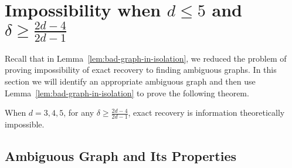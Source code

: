 \section{Impossibility when $d\le 5$ and $\delta \ge \frac{2d-4}{2d-1}$}\label{sec:impossibility}

Recall that in Lemma~\ref{lem:bad-graph-in-isolation}, we reduced the problem of proving impossibility of exact recovery to finding ambiguous graphs. 
\badgraphinisolation*
In this section we will identify an appropriate ambiguous graph and then use Lemma~\ref{lem:bad-graph-in-isolation} to prove the following theorem.
\begin{theorem}\label{thm:upper}
    When $d=3,4,5$, for any $\delta\ge \frac{2d-4}{2d-1}$, exact recovery is information theoretically impossible.
\end{theorem}
\subsection{Ambiguous Graph and Its Properties}

